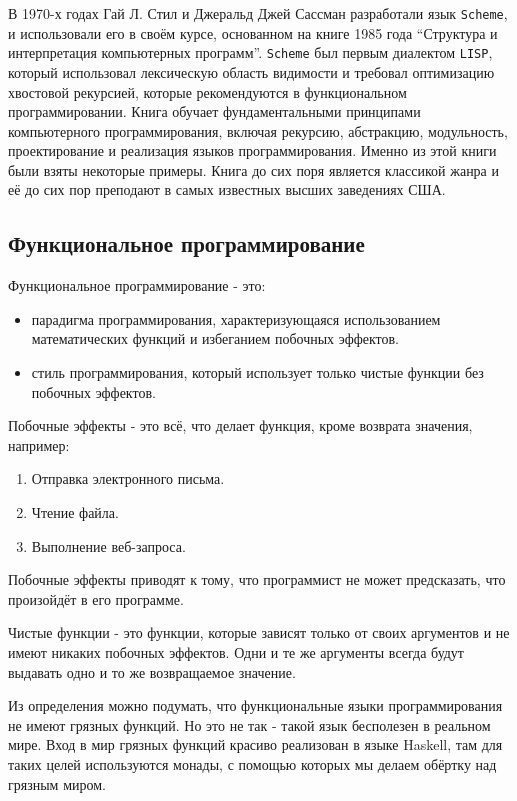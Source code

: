 В 1970-х годах Гай Л. Стил и Джеральд Джей Сассман разработали язык \texttt{Scheme}, и использовали его в своём курсе, основанном на книге 1985 года ``Структура и интерпретация компьютерных программ''\cite{SICP}.
\texttt{Scheme} был первым диалектом \texttt{LISP}, который использовал лексическую область видимости и требовал оптимизацию хвостовой рекурсией, которые рекомендуются в функциональном программировании.
Книга обучает фундаментальными принципами компьютерного программирования, включая рекурсию, абстракцию, модульность, проектирование и реализация языков программирования. 
Именно из этой книги были взяты некоторые примеры.
Книга до сих поря является классикой жанра и её до сих пор преподают в самых известных высших заведениях США.

\subsection{Функциональное программирование}

Функциональное программирование - это:

\begin{itemize}
	\item парадигма программирования, характеризующаяся использованием математических функций и избеганием побочных эффектов.
	\item стиль программирования, который использует только чистые функции без побочных эффектов.
\end{itemize}

Побочные эффекты - это всё, что делает функция, кроме возврата значения, например:

\begin{enumerate}
	\item Отправка электронного письма.
	\item Чтение файла.
	\item Выполнение веб-запроса.
\end{enumerate}

Побочные эффекты приводят к тому, что программист не может предсказать, что произойдёт в его программе.

Чистые функции - это функции, которые зависят только от своих аргументов и не имеют никаких побочных эффектов.
Одни и те же аргументы всегда будут выдавать одно и то же возвращаемое значение.

Из определения можно подумать, что функциональные языки программирования не имеют грязных функций.
Но это не так - такой язык бесполезен в реальном мире.
Вход в мир грязных функций красиво реализован в языке Haskell, там для таких целей используются монады, с помощью которых мы делаем обёртку над грязным миром.

